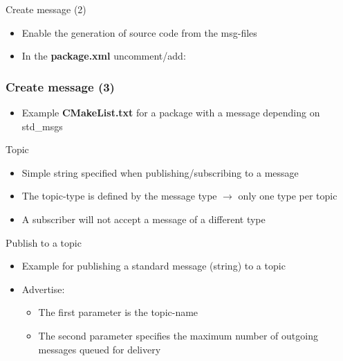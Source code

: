 \documentclass{beamer}
\begin{document}
\begin{frame}{Create message (2)}
	\begin{itemize}
		\item Enable the generation of source code from the msg-files
		\item In the \textbf{package.xml} uncomment/add:
	\end{itemize}
	
	

\end{frame}

\begin{frame}[fragile]
	\frametitle{Create message (3)}
	\begin{itemize}
		\item Example \textbf{CMakeList.txt} for a package with a message depending on std\_msgs
	\end{itemize}
			
\end{frame}

\begin{frame}{Topic}
	\begin{itemize}
		\item Simple string specified when publishing/subscribing to a message
	\end{itemize}
	
	\begin{itemize}
		\item The topic-type is defined by the message type $\rightarrow$ only one type per topic
		\item A subscriber will not accept a message of a different type
	\end{itemize}	
\end{frame}	

\begin{frame}{Publish to a topic}
	\begin{itemize}
		\item Example for publishing a standard message (string) to a topic
		
		\item Advertise:
		\begin{itemize}
			\item The first parameter is the topic-name
			\item The second parameter specifies the maximum number of outgoing messages queued for delivery			
		\end{itemize}
	\end{itemize}
\end{frame}	
\end{document}
